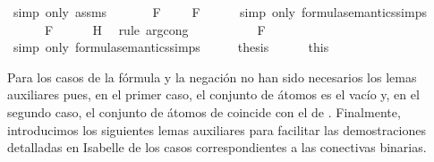 \begin{isabellebody}
\ {\isacharparenleft}simp\ only{\isacharcolon}\ assms{\isacharparenleft}{}{\isacharparenright}{\isacharparenright}\isanewline
\ \ \isamarkupfalse%
\ {\isachardoublequoteopen}{\isasymA}\ {\isasymTurnstile}\ {\isacharparenleft}\isactrlbold {\isasymnot}\ F{\isacharparenright}\ {\isacharequal}\ {\isacharparenleft}{\isasymnot}\ {\isasymA}\ {\isasymTurnstile}\ F{\isacharparenright}{\isachardoublequoteclose}\isanewline
\ \ \ \ \isamarkupfalse%
\ {\isacharparenleft}simp\ only{\isacharcolon}\ formula{\isacharunderscore}semantics{\isachardot}simps{\isacharparenleft}{}{\isacharparenright}{\isacharparenright}\isanewline
\ \ \isamarkupfalse%
\ \isamarkupfalse%
\ {\isachardoublequoteopen}{\isasymdots}\ {\isacharequal}\ {\isacharparenleft}{\isasymnot}\ {\isasymA}\ {\isasymTurnstile}\ F{\isacharparenright}{\isachardoublequoteclose}\isanewline
\ \ \ \ \isamarkupfalse%
\ H\ \isamarkupfalse%
\ {\isacharparenleft}rule\ arg{\isacharunderscore}cong{\isacharparenright}\isanewline
\ \ \isamarkupfalse%
\ \isamarkupfalse%
\ {\isachardoublequoteopen}{\isasymdots}\ {\isacharequal}\ {\isasymA}\ {\isasymTurnstile}\ {\isacharparenleft}\isactrlbold {\isasymnot}\ F{\isacharparenright}{\isachardoublequoteclose}\isanewline
\ \ \ \ \isamarkupfalse%
\ {\isacharparenleft}simp\ only{\isacharcolon}\ formula{\isacharunderscore}semantics{\isachardot}simps{\isacharparenleft}{}{\isacharparenright}{\isacharparenright}\isanewline
\ \ \isamarkupfalse%
\ \isamarkupfalse%
\ {\isacharquery}thesis\isanewline
\ \ \ \ \isamarkupfalse%
\ this\isanewline
{}\isamarkupfalse%
%
\endisatagproof
{\isafoldproof}%
%
\isadelimproof
%
\endisadelimproof
%
\begin{isamarkuptext}%
Para los casos de la fórmula \isa{{\isasymbottom}} y la negación  no han sido
  necesarios los lemas auxiliares pues, en el primer caso, el conjunto
  de átomos es el vacío y, en el segundo caso, el conjunto de átomos de
   coincide con el de . Finalmente, introducimos los siguientes 
  lemas auxiliares para facilitar las demostraciones detalladas en 
  Isabelle de los casos correspondientes a las conectivas binarias.%
\end{isamarkuptext}\isamarkuptrue%
\isamarkupfalse%

\end{isabellebody}
